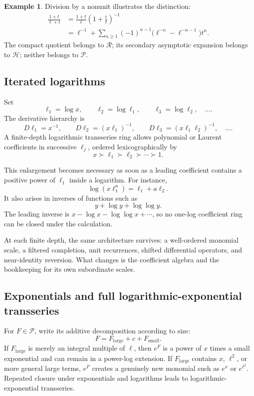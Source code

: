 \documentclass[11pt,oneside]{article}
\numberwithin{equation}{section}
\theoremstyle{definition}
\newtheorem{example}[theorem]{Example}
\newcommand{\PL}{\mathscr P}
\newcommand{\RL}{\mathscr R}
\newcommand{\HL}{\mathscr H}
\begin{document}
\begin{example}
Division by a nonunit illustrates the distinction:
\begin{align}
 \frac{1+t}{\ell+t}
 &=\frac{1+t}{\ell}\left(1+\frac{t}{\ell}\right)^{-1}\nonumber\\
 &=\ell^{-1}
 +\sum_{n\ge1}(-1)^{n-1}
   \bigl(\ell^{-n}-\ell^{-n-1}\bigr)t^n.
 \label{eq:nonunit-division-example}
\end{align}
The compact quotient belongs to \(\RL\); its secondary asymptotic expansion
belongs to \(\HL\); neither belongs to \(\PL\).
\end{example}

\subsection{Iterated logarithms}

Set
\[
  \ell_1=\log x,
  \qquad \ell_2=\log\ell_1,
  \qquad \ell_3=\log\ell_2,
  \quad\ldots.
\]
The derivative hierarchy is
\begin{equation}\label{eq:iterated-log-derivatives}
  D\ell_1=x^{-1},
  \qquad
  D\ell_2=(x\ell_1)^{-1},
  \qquad
  D\ell_3=(x\ell_1\ell_2)^{-1},
  \quad\ldots.
\end{equation}
A finite-depth logarithmic transseries ring allows polynomial or Laurent
coefficients in successive \(\ell_j\), ordered lexicographically by
\[
  x\succ\ell_1\succ\ell_2\succ\cdots\succ1.
\]

This enlargement becomes necessary as soon as a leading coefficient contains a
positive power of \(\ell_1\) inside a logarithm.  For instance,
\[
  \log(x\ell_1^a)=\ell_1+a\ell_2.
\]
It also arises in inverses of functions such as
\[
  y+\log y+\log\log y.
\]
The leading inverse is
\(x-\log x-\log\log x+\cdots\), so no one-log coefficient ring can be closed
under the calculation.

At each finite depth, the same architecture survives: a well-ordered monomial
scale, a filtered completion, unit recurrences, shifted differential operators,
and near-identity reversion.  What changes is the coefficient algebra and the
bookkeeping for its own subordinate scales.

\subsection{Exponentials and full logarithmic-exponential transseries}

For \(F\in\PL\), write its additive decomposition according to size:
\[
  F=F_{\mathrm{large}}+c+F_{\mathrm{small}}.
\]
If \(F_{\mathrm{large}}\) is merely an integral multiple of \(\ell\), then
\(e^F\) is a power of \(x\) times a small exponential and can remain in a
power-log extension.  If \(F_{\mathrm{large}}\) contains \(x\), \(\ell^2\), or
more general large terms, \(e^F\) creates a genuinely new monomial such as
\(e^x\) or \(e^{\ell^2}\).  Repeated closure under exponentials and logarithms
leads to logarithmic-exponential transseries.
\end{document}
